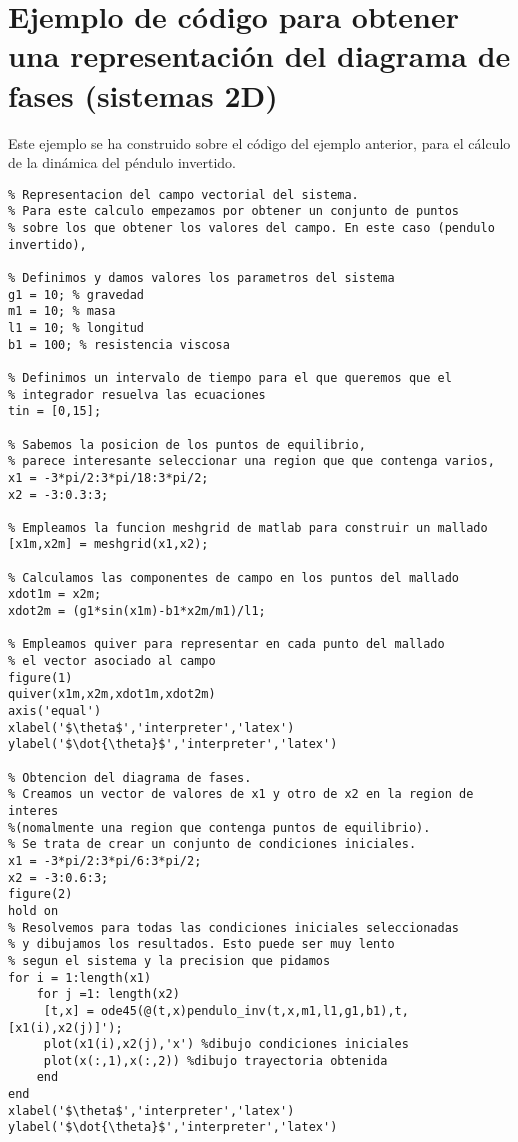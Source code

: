 \section[diagramas de fase para sistemas 2D]{Ejemplo de código para obtener una representación del diagrama de fases (sistemas 2D)}\label{AVdP}

Este ejemplo se ha construido sobre el código del ejemplo anterior, para el cálculo de la dinámica del péndulo invertido.

\begin{lstlisting}
% Representacion del campo vectorial del sistema. 
% Para este calculo empezamos por obtener un conjunto de puntos
% sobre los que obtener los valores del campo. En este caso (pendulo invertido), 

% Definimos y damos valores los parametros del sistema
g1 = 10; % gravedad
m1 = 10; % masa
l1 = 10; % longitud
b1 = 100; % resistencia viscosa

% Definimos un intervalo de tiempo para el que queremos que el
% integrador resuelva las ecuaciones
tin = [0,15];

% Sabemos la posicion de los puntos de equilibrio, 
% parece interesante seleccionar una region que que contenga varios,
x1 = -3*pi/2:3*pi/18:3*pi/2;
x2 = -3:0.3:3;

% Empleamos la funcion meshgrid de matlab para construir un mallado
[x1m,x2m] = meshgrid(x1,x2);

% Calculamos las componentes de campo en los puntos del mallado
xdot1m = x2m; 
xdot2m = (g1*sin(x1m)-b1*x2m/m1)/l1;

% Empleamos quiver para representar en cada punto del mallado
% el vector asociado al campo 
figure(1)
quiver(x1m,x2m,xdot1m,xdot2m)
axis('equal')
xlabel('$\theta$','interpreter','latex')
ylabel('$\dot{\theta}$','interpreter','latex')

% Obtencion del diagrama de fases.
% Creamos un vector de valores de x1 y otro de x2 en la region de interes
%(nomalmente una region que contenga puntos de equilibrio).
% Se trata de crear un conjunto de condiciones iniciales.
x1 = -3*pi/2:3*pi/6:3*pi/2;
x2 = -3:0.6:3;
figure(2)
hold on
% Resolvemos para todas las condiciones iniciales seleccionadas
% y dibujamos los resultados. Esto puede ser muy lento
% segun el sistema y la precision que pidamos
for i = 1:length(x1)
    for j =1: length(x2)
     [t,x] = ode45(@(t,x)pendulo_inv(t,x,m1,l1,g1,b1),t,[x1(i),x2(j)]');
     plot(x1(i),x2(j),'x') %dibujo condiciones iniciales
     plot(x(:,1),x(:,2)) %dibujo trayectoria obtenida 
    end
end
xlabel('$\theta$','interpreter','latex')
ylabel('$\dot{\theta}$','interpreter','latex')

\end{lstlisting}
